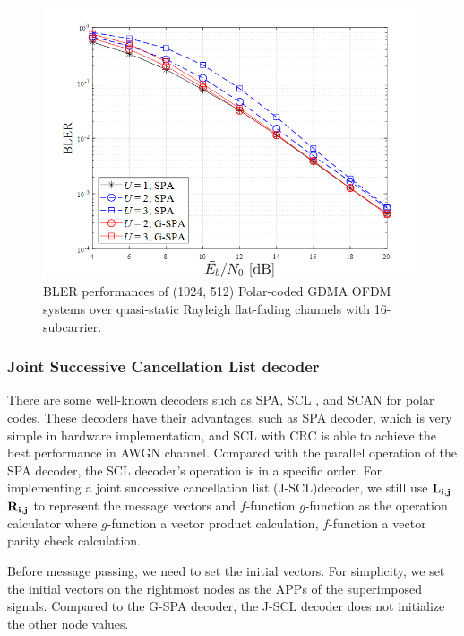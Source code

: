 \begin{figure}[H]
 \centering
 \includegraphics[width=14cm]{fig/bler_gdma_ofdm_polar_spa.png}
 \caption{BLER performances of (1024, 512) Polar-coded GDMA OFDM systems over quasi-static Rayleigh flat-fading channels with 16-subcarrier.}
 \label{fig:bler_ofdm_polar_spa}
\end{figure}

\subsubsection{Joint Successive Cancellation List decoder}

 There are some well-known decoders such as SPA\cite{arikan2010polar}, SCL \cite{scl15}, and SCAN for polar codes. These decoders have their advantages, such as SPA decoder, which is very simple in hardware implementation, and SCL with CRC is able to achieve the best performance in AWGN channel. Compared with the parallel operation of the SPA decoder, the SCL decoder's operation is in a specific order. For implementing a joint successive cancellation list (J-SCL)decoder, we still use $\bf{L_{i,j}}$  $\bf{R_{i,j}}$  to represent the message vectors and $f$-function $g$-function as the operation calculator where $g$-function a vector product calculation, $f$-function a vector parity check calculation. 

Before message passing, we need to set the initial vectors. For simplicity, we set the initial vectors on the rightmost nodes as the  APPs of the superimposed signals. Compared to the G-SPA decoder, the J-SCL decoder does not initialize the other node values.

